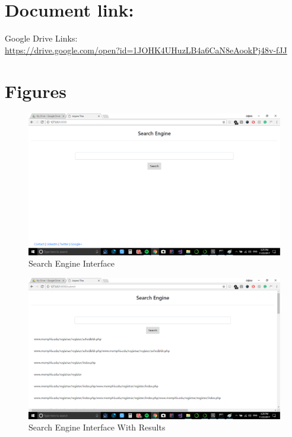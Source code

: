 \documentclass[12pt]{article}
\begin{document}
\section*{Document link:}
Google Drive Links:\\
\url{https://drive.google.com/open?id=1JOHK4UHuzLB4a6CaN8eAookPj48v-fJJ}
\section*{Figures}
\begin{figure}[!ht]
\caption{Search Engine Interface}
\includegraphics[scale=.5]{main}
\end{figure}
\begin{figure}
\caption{Search Engine Interface With Results}
\includegraphics[scale=.5]{search}
\end{figure}
\end{document}
